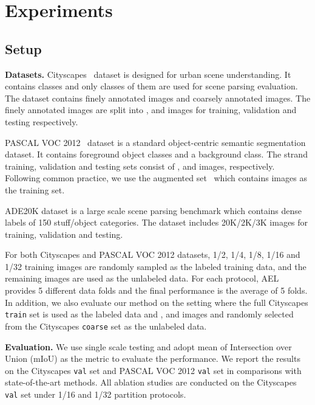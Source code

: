 \section{Experiments}

\subsection{Setup}
\noindent\textbf{Datasets. } Cityscapes~\cite{CordtsORREBFRS16} dataset is designed for urban scene understanding. It contains  classes and only  classes of them are used for scene parsing evaluation. The dataset contains  finely annotated images and  coarsely annotated images. The finely annotated  images are split into ,  and  images for training, validation and testing respectively.

PASCAL VOC 2012~\cite{EveringhamGWWZ10} dataset is a standard object-centric semantic segmentation dataset. It contains  foreground object classes and a background class. The strand training, validation and testing sets consist of ,  and  images, respectively. Following common practice, we use the augmented set~\cite{HariharanABMM11} which contains  images as the training set.

ADE20K dataset \cite{zhouade} is a large scale scene parsing benchmark which contains dense labels of 150 stuff/object categories. The dataset includes 20K/2K/3K images for training, validation and testing.

For both Cityscapes and PASCAL VOC 2012 datasets, 1/2, 1/4, 1/8, 1/16 and 1/32 training images are randomly sampled as the labeled training data, and the remaining images are used as the unlabeled data. For each protocol, AEL provides 5 different data folds and the final performance is the average of 5 folds. In addition, we also evaluate our method on the setting where the full Cityscapes \texttt{train} set is used as the labeled data and ,  and  images and randomly selected from the Cityscapes \texttt{coarse} set as the unlabeled data.



\noindent\textbf{Evaluation.}
We use single scale testing and adopt mean of Intersection over Union (mIoU) as the metric to evaluate the performance. We report the results on the Cityscapes \texttt{val} set and PASCAL VOC 2012 \texttt{val} set in comparisons with state-of-the-art methods. All ablation studies are conducted on the Cityscapes \texttt{val} set under 1/16 and 1/32 partition protocols.

